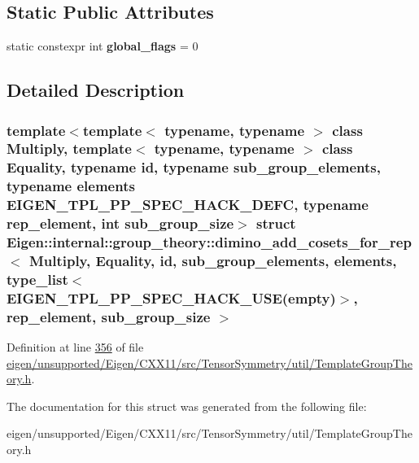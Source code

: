 \subsection*{Static Public Attributes}
\begin{DoxyCompactItemize}
\item 
\mbox{\label{struct_eigen_1_1internal_1_1group__theory_1_1dimino__add__cosets__for__rep_3_01_multiply_00_01_e1652444218b8671ae5ed0f27ebcae45c_a852dd797f07dddef07a111634a663603}} 
static constexpr int {\bfseries global\+\_\+flags} = 0
\end{DoxyCompactItemize}


\subsection{Detailed Description}
\subsubsection*{template$<$template$<$ typename, typename $>$ class Multiply, template$<$ typename, typename $>$ class Equality, typename id, typename sub\+\_\+group\+\_\+elements, typename elements  E\+I\+G\+E\+N\+\_\+\+T\+P\+L\+\_\+\+P\+P\+\_\+\+S\+P\+E\+C\+\_\+\+H\+A\+C\+K\+\_\+\+D\+E\+FC, typename rep\+\_\+element, int sub\+\_\+group\+\_\+size$>$\newline
struct Eigen\+::internal\+::group\+\_\+theory\+::dimino\+\_\+add\+\_\+cosets\+\_\+for\+\_\+rep$<$ Multiply, Equality, id, sub\+\_\+group\+\_\+elements, elements, type\+\_\+list$<$ E\+I\+G\+E\+N\+\_\+\+T\+P\+L\+\_\+\+P\+P\+\_\+\+S\+P\+E\+C\+\_\+\+H\+A\+C\+K\+\_\+\+U\+S\+E(empty)$>$, rep\+\_\+element, sub\+\_\+group\+\_\+size $>$}



Definition at line \hyperlink{eigen_2unsupported_2_eigen_2_c_x_x11_2src_2_tensor_symmetry_2util_2_template_group_theory_8h_source_l00356}{356} of file \hyperlink{eigen_2unsupported_2_eigen_2_c_x_x11_2src_2_tensor_symmetry_2util_2_template_group_theory_8h_source}{eigen/unsupported/\+Eigen/\+C\+X\+X11/src/\+Tensor\+Symmetry/util/\+Template\+Group\+Theory.\+h}.



The documentation for this struct was generated from the following file\+:\begin{DoxyCompactItemize}
\item 
eigen/unsupported/\+Eigen/\+C\+X\+X11/src/\+Tensor\+Symmetry/util/\+Template\+Group\+Theory.\+h\end{DoxyCompactItemize}
